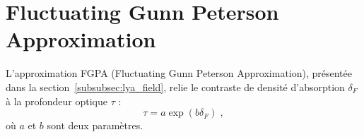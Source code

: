 % 


% 

\chapter{Fluctuating Gunn Peterson Approximation}
\label{app:fgpa}

L'approximation FGPA (Fluctuating Gunn Peterson Approximation), présentée dans la section~\ref{subsubsec:lya_field}, relie le contraste de densité d'absorption \lya{} $\delta_F$ à la profondeur optique $\tau$ :
\begin{equation}
  \tau = a \exp(b \delta_F) \; ,
\end{equation}
où $a$ et $b$ sont deux paramètres.

